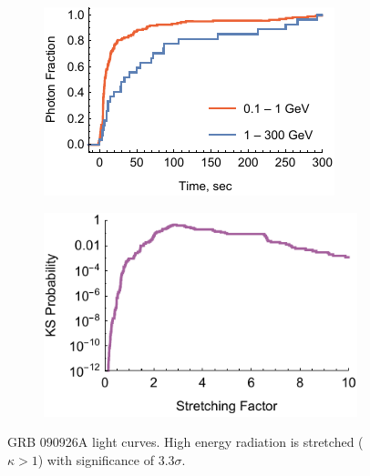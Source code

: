 \documentclass[manuscript]{aastex}
\begin{document}
\begin{figure}
        \centering
        \begin{subfigure}{0.49\textwidth}
                \includegraphics[width=\textwidth]{lightCurve090926A}
                \label{fig:lightCurve090926A}
        \end{subfigure}
        \begin{subfigure}{0.49\textwidth}
                \includegraphics[width=\textwidth]{probabilities090926A}
                \label{fig:probabilities090926A}
        \end{subfigure}
        \caption{GRB 090926A light curves. High energy radiation is stretched ($\kappa > 1$) with significance of $3.3\sigma$.}
        \label{fig:grb090926A}
\end{figure}
\end{document}
